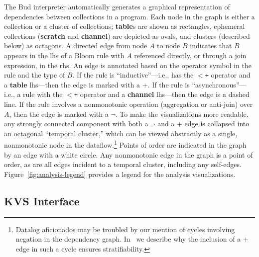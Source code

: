 The Bud interpreter automatically generates a graphical
representation of dependencies between collections in a program.
Each node in the graph is either a collection or a cluster of collections; \textbf{table}s are shown as rectangles, ephemeral
collections (\textbf{scratch} and \textbf{channel}) are depicted as ovals, and clusters (described below) as octagons.  A
directed edge from node $A$ to node $B$ indicates that $B$ appears in the
lhs of a Bloom rule with $A$ referenced directly, or through a join expression,
in the rhs.  An edge is annotated based on the operator symbol in the rule and
the type of $B$.  If the rule is ``inductive''---i.e., has the \texttt{$<$+}
operator and a {\bf table} lhs---then the edge is marked with a $+$.  If the
rule is ``asynchronous''---i.e., a rule with the \texttt{$<$+} operator and a {\bf
channel} lhs---then the edge is a dashed line.  If the rule involves
a nonmonotonic operation (aggregation or anti-join) over $A$, then the edge is marked with a $\lnot$.
To make the visualizations more readable, any strongly connected component with both a $\lnot$ and a $+$ edge is collapsed into an octagonal ``temporal cluster,'' 
which can be viewed abstractly as a single, nonmonotonic node in the 
dataflow.\footnote{Datalog aficionados may be troubled by our mention of cycles
involving negation in the dependency graph.  In~\cite{dedalus} we
describe why the inclusion of a $+$ edge in such a cycle ensures stratifiability.}
Points of order are indicated in the graph by an edge with a white circle.
 Any nonmonotonic edge in the graph is a point of order, as are all edges incident to a temporal cluster, including any self-edges.  Figure~\ref{fig:analysis-legend} provides a legend for the analysis visualizations.



\subsection{KVS Interface}


